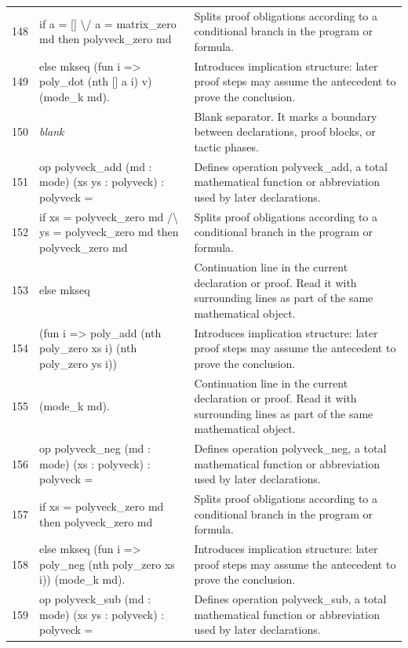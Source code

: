 \documentclass[10pt]{article}
\begin{document}
\begin{longtable}{r L{0.53\textwidth} L{0.37\textwidth}}
148 & {\ttfamily\scriptsize   if a = [] \textbackslash{}/ a = matrix\_zero md then polyveck\_zero md} & Splits proof obligations according to a conditional branch in the program or formula. \\
149 & {\ttfamily\scriptsize   else mkseq (fun i => poly\_dot (nth [] a i) v) (mode\_k md).} & Introduces implication structure: later proof steps may assume the antecedent to prove the conclusion. \\
150 & {\ttfamily\scriptsize \emph{blank}} & Blank separator.  It marks a boundary between declarations, proof blocks, or tactic phases. \\
151 & {\ttfamily\scriptsize op polyveck\_add (md : mode) (xs ys : polyveck) : polyveck =} & Defines operation polyveck\_add, a total mathematical function or abbreviation used by later declarations. \\
152 & {\ttfamily\scriptsize   if xs = polyveck\_zero md /\textbackslash{} ys = polyveck\_zero md then polyveck\_zero md} & Splits proof obligations according to a conditional branch in the program or formula. \\
153 & {\ttfamily\scriptsize   else mkseq} & Continuation line in the current declaration or proof.  Read it with surrounding lines as part of the same mathematical object. \\
154 & {\ttfamily\scriptsize     (fun i => poly\_add (nth poly\_zero xs i) (nth poly\_zero ys i))} & Introduces implication structure: later proof steps may assume the antecedent to prove the conclusion. \\
155 & {\ttfamily\scriptsize     (mode\_k md).} & Continuation line in the current declaration or proof.  Read it with surrounding lines as part of the same mathematical object. \\
156 & {\ttfamily\scriptsize op polyveck\_neg (md : mode) (xs : polyveck) : polyveck =} & Defines operation polyveck\_neg, a total mathematical function or abbreviation used by later declarations. \\
157 & {\ttfamily\scriptsize   if xs = polyveck\_zero md then polyveck\_zero md} & Splits proof obligations according to a conditional branch in the program or formula. \\
158 & {\ttfamily\scriptsize   else mkseq (fun i => poly\_neg (nth poly\_zero xs i)) (mode\_k md).} & Introduces implication structure: later proof steps may assume the antecedent to prove the conclusion. \\
159 & {\ttfamily\scriptsize op polyveck\_sub (md : mode) (xs ys : polyveck) : polyveck =} & Defines operation polyveck\_sub, a total mathematical function or abbreviation used by later declarations. \\

\end{longtable}
\end{document}
